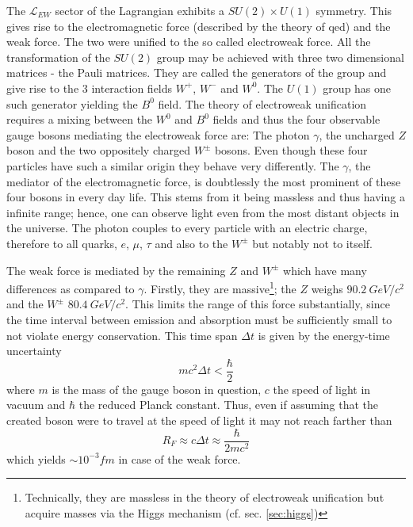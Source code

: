 The $\mathcal{L}_{EW}$ sector of the Lagrangian exhibits a $SU(2) \times U(1)$ symmetry. This gives rise to the electromagnetic force (described by the theory of \gls{qed}) and the weak force. The two were unified to the so called electroweak force. All the transformation of the $SU(2)$ group may be achieved with three two dimensional matrices - the Pauli matrices. They are called the generators of the group and give rise to the 3 interaction fields $W^+$, $W^-$ and $W^0$. The $U(1)$ group has one such generator yielding the $B^0$ field. The theory of electroweak unification requires a mixing between the $W^0$ and $B^0$ fields and thus the four observable gauge bosons mediating the electroweak force are: The photon $\gamma$, the uncharged $Z$ boson and the two oppositely charged $W^\pm$ bosons. Even though these four particles have such a similar origin they behave very differently. The $\gamma$, the mediator of the electromagnetic force, is doubtlessly the most prominent of these four bosons in every day life. This stems from it being massless and thus having a infinite range; hence, one can observe light even from the most distant objects in the universe. The photon couples to every particle with an electric charge, therefore to all quarks, $e$, $\mu$, $\tau$ and also to the $W^\pm$ but notably not to itself. 

The weak force is mediated by the remaining $Z$ and $W^\pm$ which have many differences as compared to $\gamma$. Firstly, they are massive\footnote{Technically, they are massless in the theory of electroweak unification but acquire masses via the Higgs mechanism (cf. sec. \ref{sec:higgs})}; the $Z$ weighs $\SI{90.2}{GeV/c^2}$ and the $W^\pm$ $\SI{80.4}{GeV/c^2}$. This limits the range of this force substantially, since the time interval between emission and absorption must be sufficiently small to not violate energy conservation. This time span $\Delta t$ is given by the energy-time uncertainty
\begin{equation}
  \label{eq:energy-time-uncertainty}
  mc^2\Delta t < \frac{\hbar}{2}
\end{equation}
where $m$ is the mass of the gauge boson in question, $c$ the speed of light in vacuum and $\hbar$ the reduced Planck constant. Thus, even if assuming that the created boson were to travel at the speed of light it may not reach farther than
\begin{equation}
  R_F \approx c\Delta t \approx \frac{\hbar}{2mc^2}
\end{equation}
which yields $\sim 10^{-3}\si{fm}$ in case of the weak force.

